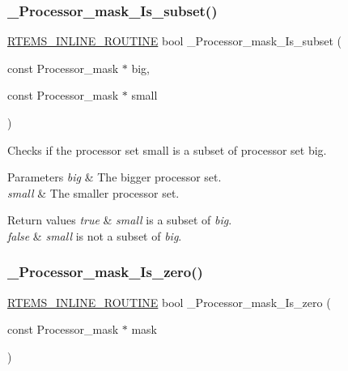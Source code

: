 \subsubsection{\texorpdfstring{\_Processor\_mask\_Is\_subset()}{\_Processor\_mask\_Is\_subset()}}
{\footnotesize\ttfamily \mbox{\hyperlink{group__RTEMSScoreBaseDefs_gac216239df231d5dbd15e3520b0b9313f}{R\+T\+E\+M\+S\+\_\+\+I\+N\+L\+I\+N\+E\+\_\+\+R\+O\+U\+T\+I\+NE}} bool \+\_\+\+Processor\+\_\+mask\+\_\+\+Is\+\_\+subset (\begin{DoxyParamCaption}\item[{const Processor\+\_\+mask $\ast$}]{big,  }\item[{const Processor\+\_\+mask $\ast$}]{small }\end{DoxyParamCaption})}



Checks if the processor set small is a subset of processor set big. 


\begin{DoxyParams}{Parameters}
{\em big} & The bigger processor set. \\
\hline
{\em small} & The smaller processor set.\\
\hline
\end{DoxyParams}

\begin{DoxyRetVals}{Return values}
{\em true} & {\itshape small} is a subset of {\itshape big}. \\
\hline
{\em false} & {\itshape small} is not a subset of {\itshape big}. \\
\hline
\end{DoxyRetVals}
\mbox{\label{group__RTEMSScoreProcessorMask_gad7417e61f45dc48871943c92b7d13167}} 
\subsubsection{\texorpdfstring{\_Processor\_mask\_Is\_zero()}{\_Processor\_mask\_Is\_zero()}}
{\footnotesize\ttfamily \mbox{\hyperlink{group__RTEMSScoreBaseDefs_gac216239df231d5dbd15e3520b0b9313f}{R\+T\+E\+M\+S\+\_\+\+I\+N\+L\+I\+N\+E\+\_\+\+R\+O\+U\+T\+I\+NE}} bool \+\_\+\+Processor\+\_\+mask\+\_\+\+Is\+\_\+zero (\begin{DoxyParamCaption}\item[{const Processor\+\_\+mask $\ast$}]{mask }\end{DoxyParamCaption})}



